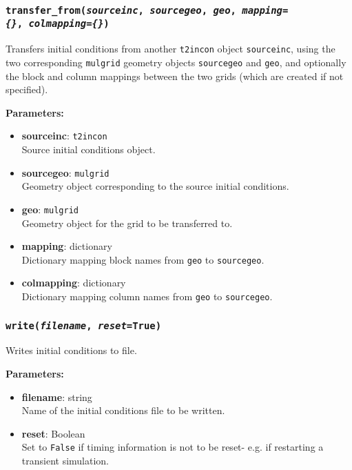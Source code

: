 \subsubsection{\texttt{transfer\_from(\emph{sourceinc}, \emph{sourcegeo}, \emph{geo}, \emph{mapping=\{\}},\
    \emph{colmapping=\{\}})}}
\label{sec:t2incon:transfer_from}

Transfers initial conditions from another \texttt{t2incon} object \texttt{sourceinc}, using the two corresponding \texttt{mulgrid} geometry objects \texttt{sourcegeo} and \texttt{geo}, and optionally the block and column mappings between the two grids (which are created if not specified).

\textbf{Parameters:}
\begin{itemize}
\item \textbf{sourceinc}: \texttt{t2incon}\\
  Source initial conditions object.
\item \textbf{sourcegeo}: \texttt{mulgrid}\\
  Geometry object corresponding to the source initial conditions.
\item \textbf{geo}: \texttt{mulgrid}\\
  Geometry object for the grid to be transferred to.
\item \textbf{mapping}: dictionary\\
  Dictionary mapping block names from \texttt{geo} to \texttt{sourcegeo}.
\item \textbf{colmapping}: dictionary\\
  Dictionary mapping column names from \texttt{geo} to \texttt{sourcegeo}.
\end{itemize}

\subsubsection{\texttt{write(\emph{filename}, \emph{reset}=True)}}
\label{sec:t2incon:write}

Writes initial conditions to file.

\textbf{Parameters:}
\begin{itemize}
\item \textbf{filename}: string\\
  Name of the initial conditions file to be written.
\item \textbf{reset}: Boolean\\
  Set to \texttt{False} if timing information is not to be reset- e.g. if restarting a transient simulation.
\end{itemize}

